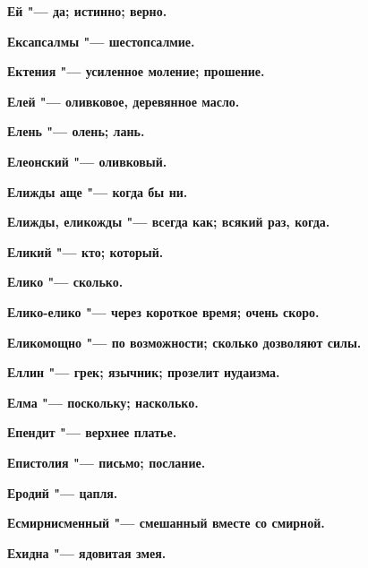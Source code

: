 \begin{mymulticols}{2}
\bfseries Ей\normalfont{} "--- да; истинно; верно. 




\bfseries Ексапсалмы\normalfont{} "--- шестопсалмие. 




\bfseries Ектения\normalfont{} "--- усиленное моление; прошение. 




\bfseries Елей\normalfont{} "--- оливковое, деревянное масло. 




\bfseries Елень\normalfont{} "--- олень; лань. 




\bfseries Елеонский\normalfont{} "--- оливковый. 




\bfseries Елижды аще\normalfont{} "--- когда бы ни. 




\bfseries Елижды, еликожды\normalfont{} "--- всегда как; всякий раз, когда. 




\bfseries Еликий\normalfont{} "--- кто; который. 




\bfseries Елико\normalfont{} "--- сколько. 




\bfseries Елико-елико\normalfont{} "--- через короткое время; очень скоро. 




\bfseries Еликомощно\normalfont{} "--- по возможности; сколько дозволяют силы. 




\bfseries Еллин\normalfont{} "--- грек; язычник; прозелит иудаизма. 




\bfseries Елма\normalfont{} "--- поскольку; насколько. 




\bfseries Епендит\normalfont{} "--- верхнее платье. 




\bfseries Епистолия\normalfont{} "--- письмо; послание. 




\bfseries Еродий\normalfont{} "--- цапля. 




\bfseries Есмирнисменный\normalfont{} "--- смешанный вместе со смирной. 




\bfseries Ехидна\normalfont{} "--- ядовитая змея. 





\end{mymulticols}
